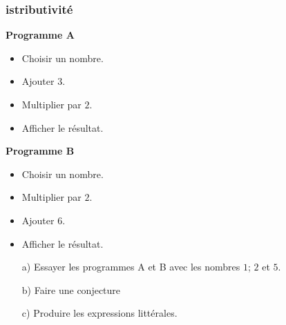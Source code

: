 \documentclass{beamer}
\begin{document}
\begin{frame}
  \frametitle{ istributivité}

  \begin{multicols}{2}
    \textbf{Programme A}
    \begin{itemize}
    \item Choisir un nombre.
    \item Ajouter $3$.
    \item Multiplier par $2$.
    \item Afficher le résultat.
    \end{itemize}

    \textbf{Programme B}  
    \begin{itemize}
    \item Choisir un nombre.
    \item Multiplier par $2$.
    \item Ajouter $6$.
    \item Afficher le résultat.
    \end{itemize}
  \end{multicols}

  \begin{enumerate}
  \item[a)] Essayer les programmes A et B avec les nombres $1$; $2$ et $5$.
  \item[b)] Faire une conjecture
  \item[c)] Produire les expressions littérales.
  \end{enumerate}
  
\end{frame}
\end{document}
